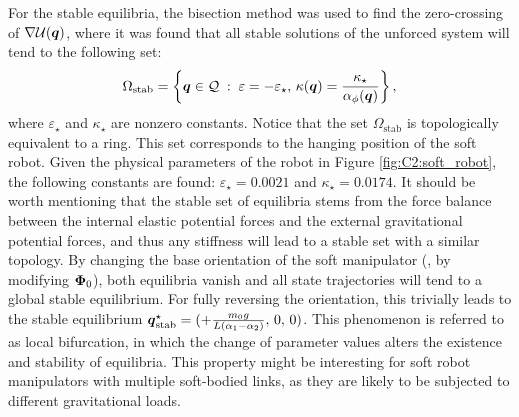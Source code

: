 For the stable equilibria, the bisection method was used to find the zero-crossing of $\nabla \mathcal{U}({{\boldsymbol{q}}})$, where it was found that all stable solutions of the unforced system will tend to the following set:
%
\begin{equation*}
\Omega_{\textrm{stab}} = \left\{{\boldsymbol{q}}\in \mathcal{Q}\;:\;\varepsilon=-\varepsilon_\star,\, \kappa({\boldsymbol{q}}) = \frac{\kappa_\star}{\alpha_\phi({\boldsymbol{q}})} \right\}, \notag
\end{equation*}
%
where $\varepsilon_\star$ and $\kappa_\star$ are nonzero constants. Notice that the set $\Omega_{\textrm{stab}}$ is topologically equivalent to a ring. This set corresponds to the hanging position of the soft robot. Given the physical parameters of the robot in Figure \ref{fig:C2:soft_robot}, the following constants are found: $\varepsilon_\star = 0.0021$ and $\kappa_\star = 0.0174$.  It should be worth mentioning that the stable set of equilibria stems from the force balance between the internal elastic potential forces and the external gravitational potential forces, and thus any stiffness will lead to a stable set with a similar topology. By changing the base orientation of the soft manipulator (\ie, by modifying ${\boldsymbol{\Phi}}_0$), both equilibria vanish and all state trajectories will tend to a global stable equilibrium. For fully reversing the orientation, this trivially leads to the stable equilibrium ${\boldsymbol{q}}^\star_{\textrm{stab}} = (+\tfrac{m_0 g}{L (\alpha_1 - \alpha_2)},\, 0,\, 0)$. This phenomenon is referred to as local bifurcation, in which the change of parameter values alters the existence and stability of equilibria. This property might be interesting for soft robot manipulators with multiple soft-bodied links, as they are likely to be subjected to different gravitational loads.
%

